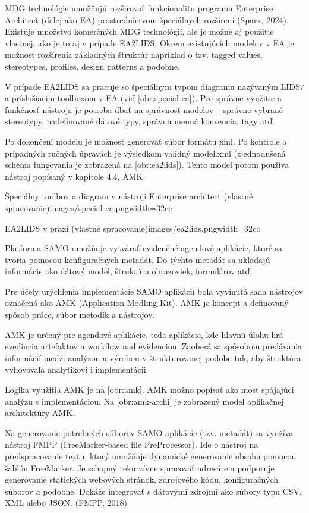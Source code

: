 MDG technológie umožňujú rozširovať funkcionalitu programu Enterprise Architect (ďalej ako EA) prostredníctvom špeciálnych rozšírení \scr(Sparx, 2024). Existuje množstvo komerčných MDG technológií, ale je možné aj použitie vlastnej, ako je to aj v prípade EA2LIDS. Okrem existujúcich modelov v EA je možnosť rozšírenia základných štruktúr napríklad o tzv. tagged values, stereotypes, profiles, design patterns a podobne. 

V prípade EA2LIDS sa pracuje so špeciálnym typom diagramu nazývaným LIDS7 a príslušiacim toolboxom v EA (viď [obr:special-ea]). Pre správne využitie a funkčnosť nástroja je potreba dbať na správnosť modelov -- správne vybrané stereotypy, nadefinované dátové typy, správna menná konvencia, tagy atď. 

Po dokončení modelu je možnosť generovať súbor formátu xml. Po kontrole a prípadných ručných úpravách je výsledkom validný model.xml (zjednodušená schéma fungovania je zobrazená na [obr:ea2lids]). Tento model potom používa nástroj popísaný v kapitole 4.4, AMK.

{Špeciálny toolbox a diagram v nástroji Enterprise architect (vlastné spracovanie)}{images/special-ea.png}{width=32cc}

{EA2LIDS v praxi (vlastné spracovanie)}{images/ea2lids.png}{width=32cc}

Platforma SAMO umožňuje vytvárať evidenčné agendové aplikácie, ktoré sa tvoria pomocou konfiguračných metadát. Do týchto metadát sa ukladajú informácie ako dátový model, štruktúra obrazoviek, formulárov atď.

Pre účely urýchlenia implementácie SAMO aplikácií bola vyvinutá sada nástrojov označená ako AMK (Application Modling Kit). AMK je koncept a definovaný spôsob práce, súbor metodík a nástrojov. 

AMK je určený pre agendové aplikácie, teda aplikácie, kde hlavnú úlohu hrá evedincia artefaktov a workflow nad evidenciou. Zaoberá sa spôsobom predávania informácií medzi analýzou a výrobou v štrukturovanej podobe tak, aby štruktúra vyhovovala analytikovi i implementácii.

Logika využitia AMK je na [obr:amk]. AMK možno popísať ako most spájajúci analýzu s implementáciou. Na [obr:amk-archi] je zobrazený model aplikačnej architektúry AMK.

Na generovanie potrebných súborov SAMO aplikácie (tzv. metadát) sa využíva nástroj FMPP (FreeMarker-based file PreProcessor). Ide o nástroj na predspracovanie textu, ktorý umožňuje dynamické generovanie obsahu pomocou šablón FreeMarker. Je schopný rekurzívne spracovať adresáre a podporuje generovanie statických webových stránok, zdrojového kódu, konfiguračných súborov a podobne. Dokáže integrovať s dátovými zdrojmi ako súbory typu CSV, XML alebo JSON. \scr(FMPP, 2018)

